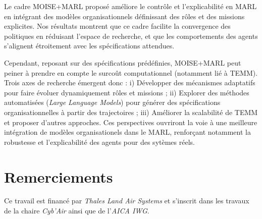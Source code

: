 \documentclass[dissemination]{jfsma}
\begin{document}
Le cadre MOISE+MARL proposé améliore le contrôle et l'explicabilité en MARL en intégrant des modèles organisationnels définissant des rôles et des missions explicites. Nos résultats montrent que ce cadre facilite la convergence des politiques en réduisant l'espace de recherche, et que les comportements des agents s'alignent étroitement avec les spécifications attendues.

Cependant, reposant sur des spécifications prédéfinies, MOISE+MARL peut peiner à prendre en compte le surcoût computationnel (notamment lié à TEMM).
%
Trois axes de recherche émergent donc :
i) Développer des mécanismes adaptatifs pour faire évoluer dynamiquement rôles et missions
; \quad
ii) Explorer des méthodes automatisées (\textit{Large Language Models}) pour générer des spécifications organisationnelles à partir des trajectoires
 ; \quad
iii) Améliorer la scalabilité de TEMM et proposer d'autres approches.
%
Ces perspectives ouvriront la voie à une meilleure intégration de modèles organisationels dans le MARL, renforçant notamment la robustesse et l'explicabilité des agents pour des sytèmes réels.

\section*{Remerciements}

Ce travail est financé par \emph{Thales Land Air Systems} et s'inscrit dans les travaux de la chaire \emph{Cyb'Air} ainsi que de l'\emph{AICA IWG}.

\renewcommand{\bibname}{}


\begin{myCustomSize}

\end{myCustomSize}
\end{document}
